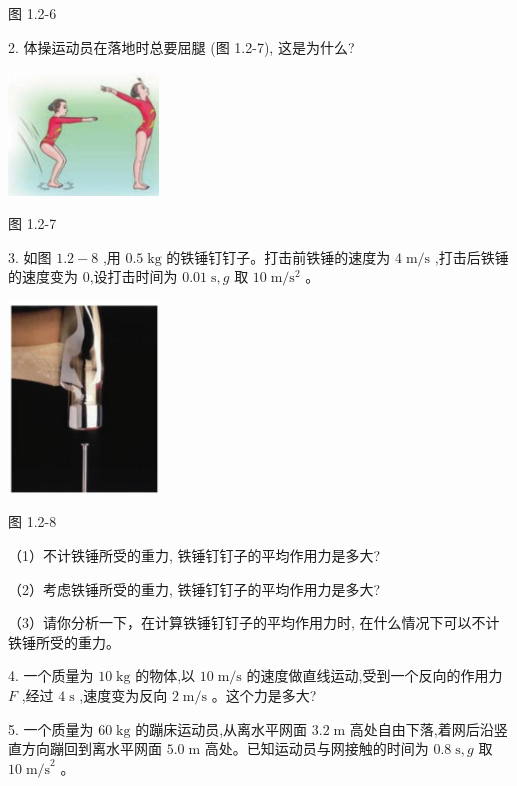 \documentclass[10pt]{article}
\begin{document}
图 1.2-6

2. 体操运动员在落地时总要屈腿 (图 1.2-7), 这是为什么?

\begin{center}
\includegraphics[max width=0.3\textwidth]{images/01910e4c-ebb8-7d2c-8f2f-2375bc1d2d12_16_491968.jpg}
\end{center}

图 1.2-7

3. 如图 \({1.2} - 8\) ,用 \({0.5}\mathrm{\;{kg}}\) 的铁锤钉钉子。打击前铁锤的速度为 \(4\mathrm{\;m}/\mathrm{s}\) ,打击后铁锤的速度变为 0,设打击时间为 \({0.01}\mathrm{\;s},g\) 取 \({10}\mathrm{\;m}/{\mathrm{s}}^{2}\) 。

\begin{center}
\includegraphics[max width=0.3\textwidth]{images/01910e4c-ebb8-7d2c-8f2f-2375bc1d2d12_16_629759.jpg}
\end{center}

图 1.2-8

（1）不计铁锤所受的重力, 铁锤钉钉子的平均作用力是多大?

（2）考虑铁锤所受的重力, 铁锤钉钉子的平均作用力是多大?

（3）请你分析一下，在计算铁锤钉钉子的平均作用力时, 在什么情况下可以不计铁锤所受的重力。

4. 一个质量为 \({10}\mathrm{\;{kg}}\) 的物体,以 \({10}\mathrm{\;m}/\mathrm{s}\) 的速度做直线运动,受到一个反向的作用力 \(F\) ,经过 \(4\mathrm{\;s}\) ,速度变为反向 \(2\mathrm{\;m}/\mathrm{s}\) 。这个力是多大?

5. 一个质量为 \({60}\mathrm{\;{kg}}\) 的蹦床运动员,从离水平网面 \({3.2}\mathrm{\;m}\) 高处自由下落,着网后沿竖直方向蹦回到离水平网面 \({5.0}\mathrm{\;m}\) 高处。已知运动员与网接触的时间为 \({0.8}\mathrm{\;s},g\) 取 \({10}{\mathrm{\;m/s}}^{2}\) 。
\end{document}
